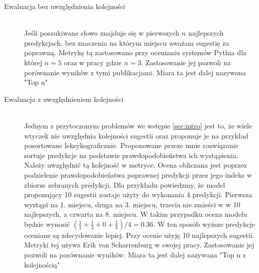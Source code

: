 \begin{description}
    \item[Ewaluacja bez uwzględnienia kolejności] 
    \hfill \\ Jeśli poszukiwane słowo znajduje się w pierwszych \begin{math}n\end{math} najlepszych predykcjach, bez znaczenia na którym miejscu uważam sugestię za poprawną. Metrykę tą zastosowano przy ocenianiu systemów
    Pythia \cite{pythia} dla której \begin{math}n = 5\end{math} oraz w pracy \cite{contextual_code_completion} gdzie \begin{math}n = 3\end{math}. Zastosowanie jej pozwoli na porównanie 
    wyników z tymi publikacjami. Miara ta jest dalej nazywana "Top n"\\
    \item[Ewaluacja z uwzględnieniem kolejności] 
    \hfill \\ Jednym z przytoczonym problemów we wstępie \ref{sec:intro} jest to, że wiele wtyczek nie uwzględnia kolejności sugestii oraz proponuje je na przykład posortowane leksykograficznie. Proponowane przeze mnie rozwiązanie 
    sortuje predykcje na podstawie prawdopodobieństwa ich wystąpienia. Należy uwzględnić tą kolejność w metryce. Ocena obliczana jest poprzez podzielenie prawdopodobieństwa poprawnej predykcji przez 
    jego indeks w zbiorze zebranych predykcji. Dla przykładu powiedzmy, że model proponujący 10 sugestii zostaje użyty do wykonania 4 predykcji. Pierwsza wystąpi na 1. miejscu, druga na 3. miejscu, trzecia nie zmieści w w 10 najlepszych, 
    a czwarta na 8. miejscu. W takim przypadku ocena modelu będzie wynosić \begin{math}(\frac{1}{1}+ \frac{1}{3}+ 0 +\frac{1}{8})/4 = 0.36\end{math}. W ten sposób wyższe predykcje oceniane są zdecydowanie lepiej.
    Przy ocenie użyję 10 najlepszych sugestii.  Metryki tej używa Erik van Scharrenburg \cite{erik} w swojej pracy. Zastosowanie jej pozwoli na porównanie wyników. Miara ta jest dalej 
    nazywana "Top n z kolejnością" \\

  \end{description}


